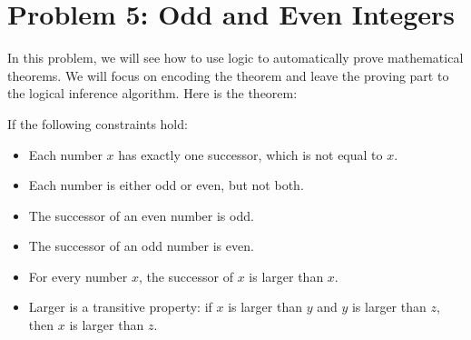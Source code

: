 \documentclass[10pt]{article}
\begin{document}
\begin{enumerate}[label=(\alph*)]
  \begin{center}
	\end{center}

\end{enumerate}

\section*{\normalsize Problem 5: Odd and Even Integers}

In this problem, we will see how to use logic to automatically prove mathematical theorems. We will focus on encoding the theorem and leave the proving part to the logical inference algorithm. Here is the theorem:\smallskip

If the following constraints hold:

\begin{itemize}
	\item Each number $x$ has exactly one successor, which is not equal to $x$.
	\item Each number is either odd or even, but not both.
	\item The successor of an even number is odd.
	\item The successor of an odd number is even.
	\item For every number $x$, the successor of $x$ is larger than $x$.
	\item Larger is a transitive property: if $x$ is larger than $y$ and $y$ is larger than $z$, then $x$ is larger than $z$. 
\end{itemize}
\end{document}
